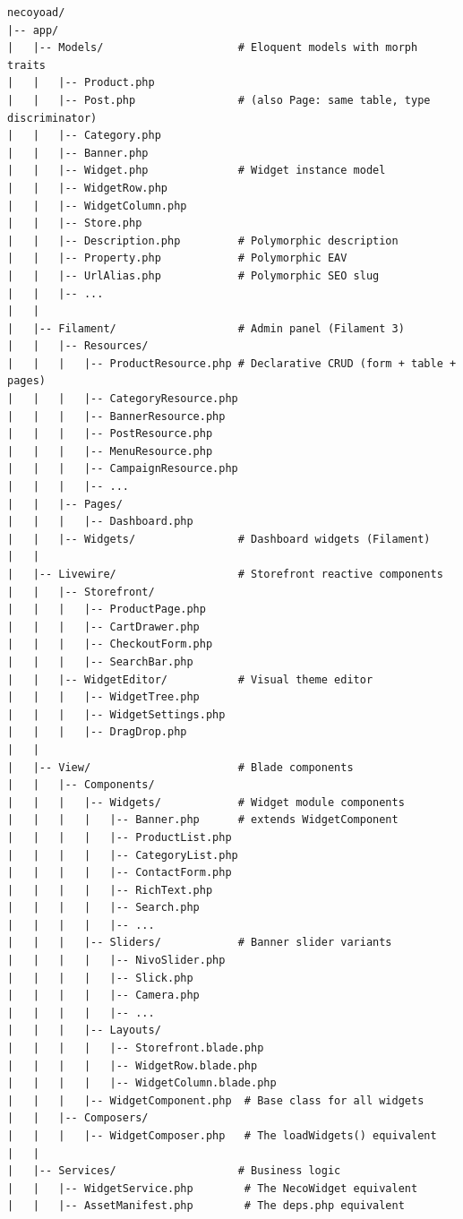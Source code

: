 \documentclass[11pt,a4paper]{article}
\begin{document}
\begin{lstlisting}[caption={New Necoyoad directory structure (abridged).},label={lst:dir}]
necoyoad/
|-- app/
|   |-- Models/                     # Eloquent models with morph traits
|   |   |-- Product.php
|   |   |-- Post.php                # (also Page: same table, type discriminator)
|   |   |-- Category.php
|   |   |-- Banner.php
|   |   |-- Widget.php              # Widget instance model
|   |   |-- WidgetRow.php
|   |   |-- WidgetColumn.php
|   |   |-- Store.php
|   |   |-- Description.php         # Polymorphic description
|   |   |-- Property.php            # Polymorphic EAV
|   |   |-- UrlAlias.php            # Polymorphic SEO slug
|   |   |-- ...
|   |
|   |-- Filament/                   # Admin panel (Filament 3)
|   |   |-- Resources/
|   |   |   |-- ProductResource.php # Declarative CRUD (form + table + pages)
|   |   |   |-- CategoryResource.php
|   |   |   |-- BannerResource.php
|   |   |   |-- PostResource.php
|   |   |   |-- MenuResource.php
|   |   |   |-- CampaignResource.php
|   |   |   |-- ...
|   |   |-- Pages/
|   |   |   |-- Dashboard.php
|   |   |-- Widgets/                # Dashboard widgets (Filament)
|   |
|   |-- Livewire/                   # Storefront reactive components
|   |   |-- Storefront/
|   |   |   |-- ProductPage.php
|   |   |   |-- CartDrawer.php
|   |   |   |-- CheckoutForm.php
|   |   |   |-- SearchBar.php
|   |   |-- WidgetEditor/           # Visual theme editor
|   |   |   |-- WidgetTree.php
|   |   |   |-- WidgetSettings.php
|   |   |   |-- DragDrop.php
|   |
|   |-- View/                       # Blade components
|   |   |-- Components/
|   |   |   |-- Widgets/            # Widget module components
|   |   |   |   |-- Banner.php      # extends WidgetComponent
|   |   |   |   |-- ProductList.php
|   |   |   |   |-- CategoryList.php
|   |   |   |   |-- ContactForm.php
|   |   |   |   |-- RichText.php
|   |   |   |   |-- Search.php
|   |   |   |   |-- ...
|   |   |   |-- Sliders/            # Banner slider variants
|   |   |   |   |-- NivoSlider.php
|   |   |   |   |-- Slick.php
|   |   |   |   |-- Camera.php
|   |   |   |   |-- ...
|   |   |   |-- Layouts/
|   |   |   |   |-- Storefront.blade.php
|   |   |   |   |-- WidgetRow.blade.php
|   |   |   |   |-- WidgetColumn.blade.php
|   |   |   |-- WidgetComponent.php  # Base class for all widgets
|   |   |-- Composers/
|   |   |   |-- WidgetComposer.php   # The loadWidgets() equivalent
|   |
|   |-- Services/                   # Business logic
|   |   |-- WidgetService.php        # The NecoWidget equivalent
|   |   |-- AssetManifest.php        # The deps.php equivalent

\end{lstlisting}
\end{document}
